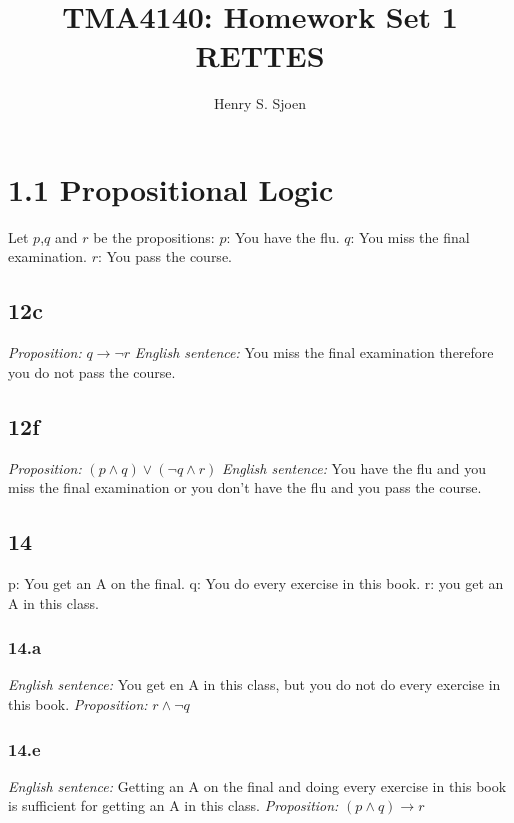 \documentclass[12pt]{article}
\author{Henry S. Sjoen}
\title{%
TMA4140: Homework Set 1\\
\textbf{RETTES}
}
\begin{document}
    \maketitle
    \tableofcontents
\title{}
    \section{1.1 Propositional Logic}
    Let $p$,$q$ and $r$ be the propositions:\newline
    $p$: You have the flu.\newline
    $q$: You miss the final examination.\newline
    $r$: You pass the course.
    \subsection{12c}
    \emph{Proposition:} $q\rightarrow \neg r$ \newline
    \emph{English sentence:} You miss the final examination therefore you do not pass the course.
\subsection{12f}
\emph{Proposition:} $ (p \wedge q) \vee (\neg q \wedge r) $ \newline
\emph{English sentence:} You have the flu and you miss the final examination or you don't have the flu and you pass the course.
\subsection{14}
p: You get an A on the final. \newline
q: You do every exercise in this book. \newline
r: you get an A in this class.

\subsubsection{14.a}
\emph{English sentence:} You get en A in this class, but you do not do every exercise in this book.\newline
\emph{Proposition:} $r \wedge \neg q$

\subsubsection{14.e}
\emph{English sentence:} Getting an A on the final and doing every exercise in this book is sufficient for getting an A in this class.\newline
\emph{Proposition:} $(p \wedge q) \rightarrow r$
\end{document}
